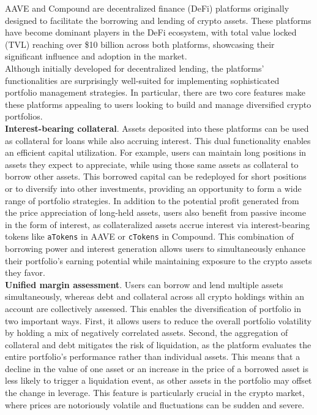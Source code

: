 \documentclass{article} %
\theoremstyle{plain}
\theoremstyle{definition} %
\begin{document}
AAVE and Compound are decentralized finance (DeFi) platforms originally designed to facilitate the borrowing and lending of crypto assets. 
 These platforms have become dominant players in the DeFi ecosystem, with total value locked (TVL) reaching over \$10 billion across both platforms, showcasing their significant influence and adoption in the market. \\

Although initially developed for decentralized lending, the platforms' functionalities are surprisingly well-suited for implementing sophisticated portfolio management strategies.
 In particular, there are two core features make these platforms appealing to users looking to build and manage diversified crypto portfolios.\\

{\bf Interest-bearing collateral}. 
 Assets deposited into these platforms can be used as collateral for loans while also accruing interest. 
 This dual functionality enables an efficient capital utilization. 
 For example, users can maintain long positions in assets they expect to appreciate, while using those same assets as collateral to borrow other assets.
 This borrowed capital can be redeployed for short positions or to diversify into other investments, providing an opportunity to form a wide range of portfolio strategies. 
 In addition to the potential profit generated from the price appreciation of long-held assets, users also benefit from passive income in the form of interest,
 as collateralized assets accrue interest via interest-bearing tokens like \texttt{aTokens} in AAVE or \texttt{cTokens} in Compound.
 This combination of borrowing power and interest generation allows users to simultaneously enhance their portfolio's earning potential while maintaining exposure to the crypto assets they favor. \\

{\bf Unified margin assessment}.
Users can borrow and lend multiple assets simultaneously, whereas debt and collateral across all crypto holdings within an account are collectively assessed. 
 This enables the diversification of portfolio in two important ways. 
 First, it allows users to reduce the overall portfolio volatility by holding a mix of negatively correlated assets.
 Second, the aggregation of collateral and debt mitigates the risk of liquidation, 
 as the platform evaluates the entire portfolio's performance rather than individual assets.
 This means that a decline in the value of one asset or an increase in the price of a borrowed asset is less likely to trigger a liquidation event,
 as other assets in the portfolio may offset the change in leverage. 
 This feature is particularly crucial in the crypto market, where prices are notoriously volatile and fluctuations can be sudden and severe. \\ 
\end{document}
